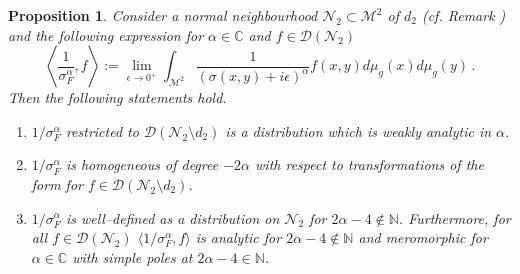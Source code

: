 \documentclass[10pt]{book}
\let\int\int
\newcommand{\Dcal}{\mathcal{D}}
\newcommand{\Mcal}{\mathcal{M}}
\newcommand{\Ncal}{\mathcal{N}}
\theoremstyle{break}
\newtheorem{proposition}{Proposition}
\begin{document}
\begin{proposition}
Consider a normal neighbourhood $\Ncal_2\subset\Mcal^2$ of $d_2$ (cf. Remark %
)
and the following expression for $\alpha\in \mathbb{C}$ and $f\in \Dcal(\Ncal_2)$ 
\[
\left\langle \frac{1}{\sigma^\alpha_F}, f \right\rangle := \lim_{\epsilon\to0^+ } \int_{\Mcal^2} \frac{1}{(\sigma(x,y)+i\epsilon)^{\alpha}} f(x,y)  d\mu_g (x) d\mu_g (y)\,.
\]
Then the following statements hold.
\begin{enumerate}
\item $1/{\sigma^\alpha_F}$ restricted to $\Dcal(\Ncal_2\setminus d_2)$ is a distribution which is weakly analytic in $\alpha$.
\item $1/{\sigma^\alpha_F}$ is homogeneous of degree $-2\alpha$ with respect to transformations of the form %
for $f\in \Dcal(\Ncal_2\setminus d_2)$.
\item $1/{\sigma^\alpha_F}$ is well--defined as a distribution on $\Ncal_2$ for $2\alpha-4\notin \mathbb{N}$. 
Furthermore, for all $f\in\Dcal(\Ncal_2)$ $\langle 1/{\sigma^\alpha_F},f\rangle$  is analytic for $2\alpha-4\notin \mathbb{N}$ and meromorphic for $\alpha \in \mathbb{C}$ with simple poles at $2\alpha-4\in \mathbb{N}$. 
\end{enumerate}
\end{proposition}
\end{document}
